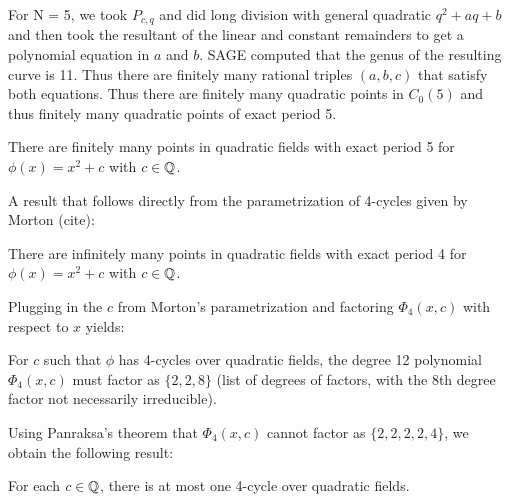For N = 5, we took $P_{c,q}$ and did long division with general quadratic $q^2 + aq + b$
and then took the resultant of the linear and constant remainders to get a
polynomial equation in $a$ and $b$. SAGE computed that the genus of the resulting
curve is 11. Thus there are finitely many rational triples $(a,b,c)$ that satisfy
both equations. Thus there are finitely many quadratic points in $C_0(5)$ and thus
finitely many quadratic points of exact period 5.
\begin{theorem}
There are finitely many points in quadratic fields with exact period 5 for
$\phi(x) = x^2 + c$ with $c \in \mathbb{Q}$.
\end{theorem}

A result that follows directly from the parametrization of 4-cycles given by 
Morton (cite):
\begin{theorem}
There are infinitely many points in quadratic fields with exact period 4 for
$\phi(x) = x^2 + c$ with $c \in \mathbb{Q}$.
\end{theorem}

Plugging in the $c$ from Morton's parametrization and factoring $\Phi_4(x,c)$
with respect to $x$ yields:
\begin{lemma}
For $c$ such that $\phi$ has 4-cycles over quadratic fields, the degree 12
polynomial $\Phi_4(x,c)$ must factor as $\{2,2,8\}$ (list of degrees of
factors, with the 8th degree factor not necessarily irreducible).
\end{lemma}

Using Panraksa's theorem that $\Phi_4(x,c)$ cannot factor as $\{2,2,2,2,4\}$,
we obtain the following result: 
\begin{theorem}
For each $c \in \mathbb{Q}$, there is at most one 4-cycle over quadratic fields.
\end{theorem}


